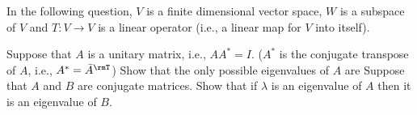 \begin{questions}
  \question In the following question, $V$ is a finite dimensional vector
  space, $W$ is a subspace of $V$ and $T\colon V\to V$ is a linear operator
  (i.e., a linear map for $V$ into itself).
  \question[4] Suppose that $A$ is a unitary matrix, i.e., $AA^*=I$. ($A^*$
  is the conjugate transpose of $A$, i.e., $A^*={\bar A}^\rmT$) Show that
  the only possible eigenvalues of $A$ are \question[4] Suppose that $A$
  and $B$ are conjugate matrices. Show that if $\lambda$ is an eigenvalue
  of $A$ then it is an eigenvalue of $B$.
\end{questions}
